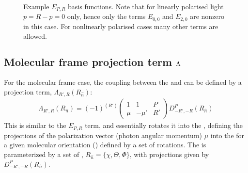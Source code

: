 \documentclass[letterpaper,table,10pt,english]{jupyterBook}
\begin{document}
\begin{figure}[htbp]
\centering
\capstart

\noindent{}
\caption{Example \(E_{P,R}\) basis functions. Note that for linearly polarised light \(p=R-p=0\) only, hence only the terms \(E_{0,0}\) and \(E_{2,0}\) are non\sphinxhyphen{}zero in this case. For non\sphinxhyphen{}linearly polarised cases many other terms are allowed.}\label{\detokenize{part1/theory_tensor_formalism_160723:fig-epr-basis}}\end{figure}


\subsection{Molecular frame projection term \protect\(\Lambda\protect\)}
\label{\detokenize{part1/theory_tensor_formalism_160723:molecular-frame-projection-term-lambda}}\label{\detokenize{part1/theory_tensor_formalism_160723:sec-theory-lambda-term}}
\sphinxAtStartPar
For the molecular frame case, the coupling between the {\hyperref[\detokenize{backmatter/glossary:term-LF}]{}} and {\hyperref[\detokenize{backmatter/glossary:term-MF}]{}} can be defined by a projection term, \(\Lambda_{R',R}(R_{\hat{n}})\):
\begin{equation}\label{equation:part1/theory_tensor_formalism_160723:eq:basis-lambda-MF-defn}
\begin{split}
\Lambda_{R',R}(R_{\hat{n}})=(-1)^{(R')}\left(\begin{array}{ccc}
1 & 1 & P\\
\mu & -\mu' & R'
\end{array}\right)D_{-R',-R}^{P}(R_{\hat{n}})
\end{split}
\end{equation}
\sphinxAtStartPar
This is similar to the \(E_{P,R}\) term, and essentially rotates it into the {\hyperref[\detokenize{backmatter/glossary:term-MF}]{}}, defining the projections of the polarization vector (photon angular momentum) \(\mu\) into the {\hyperref[\detokenize{backmatter/glossary:term-MF}]{}} for a given molecular orientation ({\hyperref[\detokenize{backmatter/glossary:term-frame-rotation}]{}}) defined by a set of rotations. The {\hyperref[\detokenize{backmatter/glossary:term-frame-rotation}]{}} is parameterized by a set of {\hyperref[\detokenize{backmatter/glossary:term-Euler-angles}]{}}, \(R_{\hat{n}}=\{\chi,\Theta,\Phi\}\), with projections given by {\hyperref[\detokenize{backmatter/glossary:term-Wigner-rotation-matrix-elements}]{}} \(D_{-R',-R}^{P}(R_{\hat{n}})\).
\end{document}
